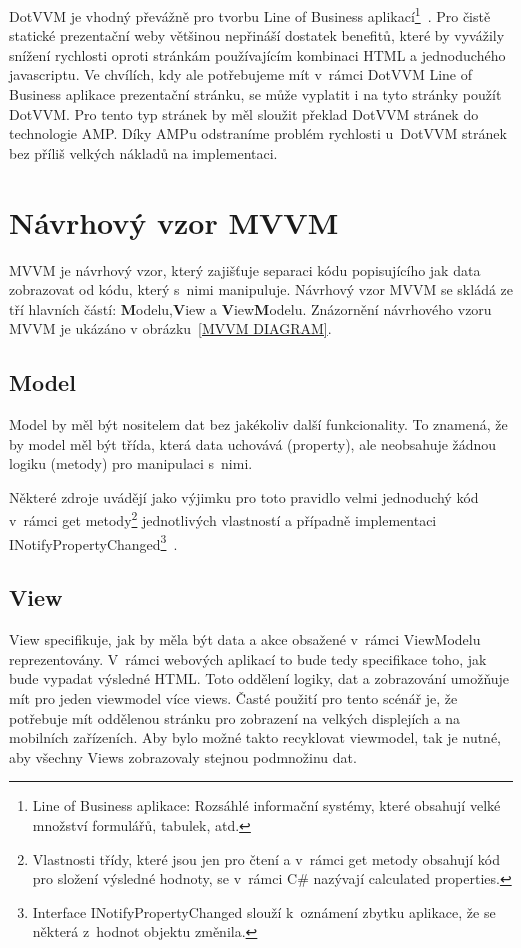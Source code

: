 DotVVM je vhodný převážně pro tvorbu Line of Business aplikací\footnote{Line of Business aplikace: Rozsáhlé informační systémy, které obsahují velké množství formulářů, tabulek, atd.}~\cite{DotVVMIntro}. Pro čistě statické prezentační weby většinou nepřináší dostatek benefitů, které by vyvážily snížení rychlosti oproti stránkám používajícím kombinaci HTML a jednoduchého javascriptu. Ve chvílích, kdy ale potřebujeme mít v~rámci DotVVM Line of Business aplikace prezentační stránku, se může vyplatit i na tyto stránky použít DotVVM. Pro tento typ stránek by měl sloužit překlad DotVVM stránek do technologie AMP. Díky AMPu odstraníme problém rychlosti u~DotVVM stránek bez příliš velkých nákladů na implementaci.

\section{Návrhový vzor MVVM}
MVVM je návrhový vzor, který zajišťuje separaci kódu popisujícího jak data zobrazovat od kódu, který s~nimi manipuluje. Návrhový vzor MVVM se skládá ze tří hlavních částí: \textbf{M}odelu,\textbf{V}iew a \textbf{V}iew\textbf{M}odelu. Znázornění návrhového vzoru MVVM je ukázáno v obrázku~\ref{MVVM DIAGRAM}.

\subsection*{Model}
Model by měl být nositelem dat bez jakékoliv další funkcionality. To znamená, že by model měl být třída, která data uchovává (property), ale neobsahuje žádnou logiku (metody) pro manipulaci s~nimi.

Některé zdroje uvádějí jako výjimku pro toto pravidlo velmi jednoduchý kód v~rámci get metody\footnote{Vlastnosti třídy, které jsou jen pro čtení a v~rámci get metody obsahují kód pro složení výsledné hodnoty, se v~rámci C# nazývají calculated properties.} jednotlivých vlastností a případně implementaci INotifyPropertyChanged\footnote{Interface INotifyPropertyChanged slouží k~oznámení zbytku aplikace, že se některá z~hodnot objektu změnila.}~\cite{microsoft_2014}.

\subsection*{View}
View specifikuje, jak by měla být data a akce obsažené v~rámci ViewModelu reprezentovány. V~rámci webových aplikací to bude tedy specifikace toho, jak bude vypadat výsledné HTML. Toto oddělení logiky, dat a zobrazování umožňuje mít pro jeden viewmodel více views. Časté použití pro tento scénář je, že potřebuje mít oddělenou stránku pro zobrazení na velkých displejích a na mobilních zařízeních. Aby bylo možné takto recyklovat viewmodel, tak je nutné, aby všechny Views zobrazovaly stejnou podmnožinu dat.
